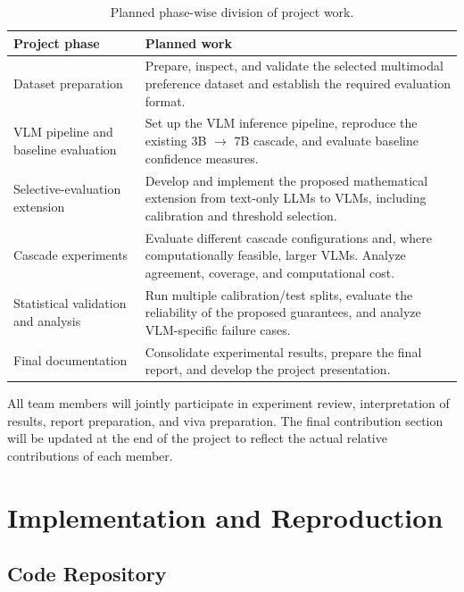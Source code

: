 \documentclass[11pt,a4paper]{article}
\begin{document}
\begin{table}[H]
\centering
\small
\caption{Planned phase-wise division of project work.}
\begin{tabularx}{\textwidth}{@{}>{\raggedright\arraybackslash}p{}Y@{}}
\toprule
\textbf{Project phase} & \textbf{Planned work} \\
\midrule

Dataset preparation &
Prepare, inspect, and validate the selected multimodal preference
dataset and establish the required evaluation format. \\

VLM pipeline and baseline evaluation &
Set up the VLM inference pipeline, reproduce the existing
3B $\rightarrow$ 7B cascade, and evaluate baseline confidence measures. \\

Selective-evaluation extension &
Develop and implement the proposed mathematical extension from
text-only LLMs to VLMs, including calibration and threshold selection. \\

Cascade experiments &
Evaluate different cascade configurations and, where computationally
feasible, larger VLMs. Analyze agreement, coverage, and computational cost. \\

Statistical validation and analysis &
Run multiple calibration/test splits, evaluate the reliability of the
proposed guarantees, and analyze VLM-specific failure cases. \\

Final documentation &
Consolidate experimental results, prepare the final report, and develop
the project presentation. \\

\bottomrule
\end{tabularx}
\end{table}
All team members will jointly participate in experiment review, interpretation
of results, report preparation, and viva preparation. The final contribution
section will be updated at the end of the project to reflect the actual
relative contributions of each member.
\section{Implementation and Reproduction}

\subsection{Code Repository}
\end{document}
